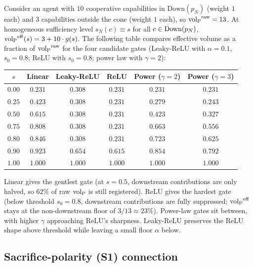 \begin{remark}
\label{rem:gate_comparison}
Consider an agent with $10$ cooperative capabilities in
$\mathrm{Down}(p_N)$ (weight $1$ each) and $3$ capabilities
outside the cone (weight $1$ each), so
${\operatorname{vol}_{\mathrm{P}}}^{\mathrm{raw}} = 13$.  At homogeneous sufficiency level
$s_N(c) \equiv s$ for all $c \in \mathrm{Down}(p_N)$,
${\operatorname{vol}_{\mathrm{P}}}^{\mathrm{eff}}(s) = 3 + 10 \cdot g(s)$.  The following
table compares effective volume as a fraction of
${\operatorname{vol}_{\mathrm{P}}}^{\mathrm{raw}}$ for the four candidate gates (Leaky-ReLU
with $\alpha = 0.1$, $s_0 = 0.8$; ReLU with $s_0 = 0.8$; power
law with $\gamma = 2$):

\begin{center}
\small
\begin{tabular}{@{}cccccc@{}}
\toprule
$s$ & Linear & Leaky-ReLU & ReLU & Power ($\gamma{=}2$)
   & Power ($\gamma{=}3$) \\
\midrule
$0.00$ & $0.231$ & $0.308$ & $0.231$ & $0.231$ & $0.231$ \\
$0.25$ & $0.423$ & $0.308$ & $0.231$ & $0.279$ & $0.243$ \\
$0.50$ & $0.615$ & $0.308$ & $0.231$ & $0.423$ & $0.327$ \\
$0.75$ & $0.808$ & $0.308$ & $0.231$ & $0.663$ & $0.556$ \\
$0.80$ & $0.846$ & $0.308$ & $0.231$ & $0.723$ & $0.625$ \\
$0.90$ & $0.923$ & $0.654$ & $0.615$ & $0.854$ & $0.792$ \\
$1.00$ & $1.000$ & $1.000$ & $1.000$ & $1.000$ & $1.000$ \\
\bottomrule
\end{tabular}
\end{center}

Linear gives the gentlest gate (at $s = 0.5$, downstream
contributions are only halved, so $62\%$ of raw ${\operatorname{vol}_{\mathrm{P}}}$ is still
registered).  ReLU gives the hardest gate (below threshold
$s_0 = 0.8$, downstream contributions are fully suppressed;
${\operatorname{vol}_{\mathrm{P}}}^{\mathrm{eff}}$ stays at the non-downstream floor of
$3/13 \approx 23\%$).  Power-law gates sit between, with
higher $\gamma$ approaching ReLU's sharpness.  Leaky-ReLU
preserves the ReLU shape above threshold while leaving a small
floor $\alpha$ below.
\end{remark}

\subsection{Sacrifice-polarity (S1) connection}


